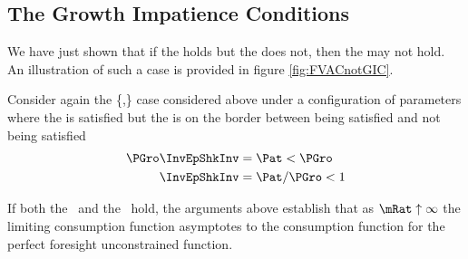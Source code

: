 \subsection{The Growth Impatience Conditions}

We have just shown that if the {\RIC} holds but the {\FHWC} does not, then the {\GICNrm} may not hold.  An illustration of such a case is provided in figure \ref{fig:FVACnotGIC}.

Consider again the \{\RIC,\cncl{\FHWC}\} case considered above under a configuration of parameters where the {\GICAbs} is satisfied but the {\GICNrm} is on the border between being satisfied and not being satisfied
\begin{equation}\begin{gathered}\begin{aligned}
  \PGro \InvEpShkInv & = \Pat < \PGro
\\ \InvEpShkInv & = \Pat/\PGro < 1                       
\end{aligned}\end{gathered}\end{equation}


If both the \GICNrm~and the \RIC~hold, the arguments above establish that as $\mRat \uparrow \infty$ the limiting consumption function asymptotes to the consumption function for the perfect foresight unconstrained function.

